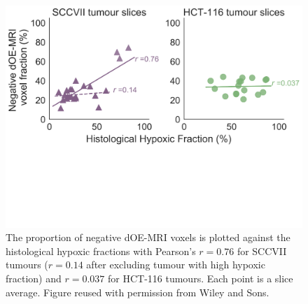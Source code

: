 \begin{figure}[htbp]
   \includegraphics[width=\textwidth]{oemri_thesis2/oemri_thesis2-images/histocorrel3.pdf} %
   \caption{The proportion of negative \ac{dOE-MRI} voxels is plotted against the histological hypoxic fractions with Pearson's $r=0.76$ for SCCVII tumours ($r=0.14$ after excluding tumour with high hypoxic fraction) and $r=0.037$ for HCT-116 tumours. Each point is a slice average. Figure reused with permission from Wiley and Sons.
   \label{histo_correlations}}
\end{figure}

